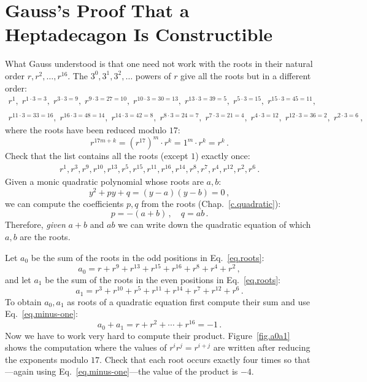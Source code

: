 \section{Gauss's Proof That a Heptadecagon Is Constructible}\label{s.gauss}

What Gauss understood is that one need not work with the roots in their natural order $r,r^2,\ldots,r^{16}$. The $3^0, 3^1, 3^2, \ldots$ powers of $r$ give all the roots but in a different order:
\[
\begin{array}{l}
r^1, \;r^{1\cdot 3 =3},\; r^{3\cdot 3=9},\; r^{9\cdot 3=27=10},\; r^{10\cdot 3=30=13},\; r^{13\cdot 3=39=5},\; r^{5\cdot 3=15},\; r^{15\cdot 3=45=11},\\\\
r^{11\cdot 3 =33=16}, \;r^{16\cdot 3=48=14},\; r^{14\cdot 3=42=8},\; r^{8\cdot 3=24=7},\;r^{7\cdot 3=21=4},\; r^{4\cdot 3=12},\; r^{12\cdot 3=36=2},\; r^{2\cdot 3=6}\,,
\end{array}
\]
where the roots have been reduced modulo $17$:
\[
r^{17m+k}=(r^{17})^m\cdot r^k=1^m\cdot r^k=r^k\,.
\]
Check that the list contains all the roots (except $1$) exactly once:
\begin{align}\label{eq.roots}
r^1, r^3, r^9, r^{10}, r^{13}, r^5, r^{15}, r^{11}, r^{16}, r^{14}, r^8, r^7, r^4, r^{12}, r^2, r^6\,.
\end{align}
Given a monic quadratic polynomial whose roots are $a,b$:
\[
y^2+py+q=(y-a)(y-b)=0\,,
\]
we can compute the coefficients $p,q$ from the roots (Chap.~\ref{c.quadratic}):
\[
p=-(a+b)\,,\quad q=ab\,.
\]
Therefore, \emph{given} $a+b$ and $ab$ we can write down the quadratic equation of which $a,b$ are the roots.

Let $a_0$ be the sum of the roots in the odd positions in Eq.~\ref{eq.roots}:
\[
a_0=r + r^9 + r^{13} +r^{15} +r^{16} + r^8+r^4+r^2\,,
\]
and let $a_1$ be the sum of the roots in the even positions  in Eq.~\ref{eq.roots}:
\[
a_1=r^3 + r^{10} + r^{5} +r^{11} +r^{14} + r^7+r^{12}+r^6\,.
\]
To obtain $a_0,a_1$ as roots of a quadratic equation first compute their sum and use Eq.~\ref{eq.minus-one}:
\[
a_0+a_1=r + r^2 + \cdots +r^{16}=-1\,.
\]
Now we have to work very hard to compute their product. Figure~\ref{fig.a0a1} shows the computation where the values of $r^ir^j=r^{i+j}$ are written after reducing the exponents modulo $17$. Check that each root occurs exactly four times so that---again using Eq.~\ref{eq.minus-one}---the value of the product is $-4$.

